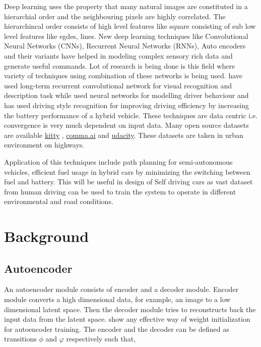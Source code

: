 \documentclass[a4paper,11pt,titlepage,drop]{article}%
\begin{document}
Deep learning uses the property that many natural images are constituted in a hierarchial order and the neighbouring pixels are highly correlated. The hierarchincal order consists of high level features like square consisting of sub low level features like egdes, lines. New deep learning techniques like Convolutional Neural Networks (CNNs), Recurrent Neural Networks (RNNs), Auto encoders and their variants have helped in modeling complex sensory rich data and generate useful commands. Lot of research is being done is this field where variety of techniques using combination of these networks is being used.  have used long-term recurrent convolutional network for visual recognition and description task while \cite{inteldrive1} used neural networks for modelling driver behaviour and \cite{inteldrive2} has used driving style recognition for improving driving efficiency by increasing the battery performance of a hybrid vehicle. These techniques are data centric i.e. convergence is very much dependent on input data. Many open source datasets are  available \href{http://www.cvlibs.net/datasets/kitti/}{kitty} \cite{kitty}, \href{http://research.comma.ai/}{comma.ai} and \href{https://github.com/udacity/self-driving-car/tree/master/datasets}{udacity}. These datasets are taken in urban environment on highways. 

Application of this techniques include path planning for semi-autonomous vehicles, efficient fuel usage in hybrid cars by minimizing the switching between fuel and battery. This will be useful in design of Self driving cars as vast dataset from human driving can be used to train the system to operate in different environmental and road conditions. 


\section{Background}
\subsection{Autoencoder}

An autoencoder module consists of encoder and a decoder module. Encoder module converts a high dimensional data, for example, an image to a low dimensional latent space. Then the decoder module tries to reconstructs back the input data from the latent space.  show any effective way of weight initialization for autoencoder training.  The encoder and the decoder can be defined as transitions $\phi$ and $\varphi$ respectively such that,
 
\end{document}
